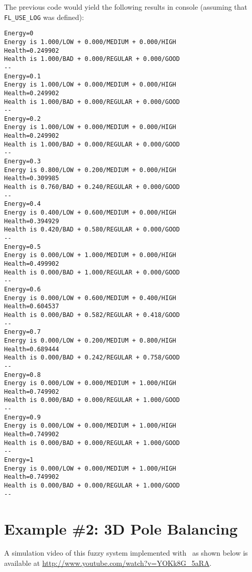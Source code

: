 	The previous code would yield the following results in console (assuming that \texttt{FL\_USE\_LOG} was defined):
	
	\begin{lstlisting}
Energy=0
Energy is 1.000/LOW + 0.000/MEDIUM + 0.000/HIGH
Health=0.249902
Health is 1.000/BAD + 0.000/REGULAR + 0.000/GOOD
--
Energy=0.1
Energy is 1.000/LOW + 0.000/MEDIUM + 0.000/HIGH
Health=0.249902
Health is 1.000/BAD + 0.000/REGULAR + 0.000/GOOD
--
Energy=0.2
Energy is 1.000/LOW + 0.000/MEDIUM + 0.000/HIGH
Health=0.249902
Health is 1.000/BAD + 0.000/REGULAR + 0.000/GOOD
--
Energy=0.3
Energy is 0.800/LOW + 0.200/MEDIUM + 0.000/HIGH
Health=0.309985
Health is 0.760/BAD + 0.240/REGULAR + 0.000/GOOD
--
Energy=0.4
Energy is 0.400/LOW + 0.600/MEDIUM + 0.000/HIGH
Health=0.394929
Health is 0.420/BAD + 0.580/REGULAR + 0.000/GOOD
--
Energy=0.5
Energy is 0.000/LOW + 1.000/MEDIUM + 0.000/HIGH
Health=0.499902
Health is 0.000/BAD + 1.000/REGULAR + 0.000/GOOD
--
Energy=0.6
Energy is 0.000/LOW + 0.600/MEDIUM + 0.400/HIGH
Health=0.604537
Health is 0.000/BAD + 0.582/REGULAR + 0.418/GOOD
--
Energy=0.7
Energy is 0.000/LOW + 0.200/MEDIUM + 0.800/HIGH
Health=0.689444
Health is 0.000/BAD + 0.242/REGULAR + 0.758/GOOD
--
Energy=0.8
Energy is 0.000/LOW + 0.000/MEDIUM + 1.000/HIGH
Health=0.749902
Health is 0.000/BAD + 0.000/REGULAR + 1.000/GOOD
--
Energy=0.9
Energy is 0.000/LOW + 0.000/MEDIUM + 1.000/HIGH
Health=0.749902
Health is 0.000/BAD + 0.000/REGULAR + 1.000/GOOD
--
Energy=1
Energy is 0.000/LOW + 0.000/MEDIUM + 1.000/HIGH
Health=0.749902
Health is 0.000/BAD + 0.000/REGULAR + 1.000/GOOD
--
	\end{lstlisting}
	
	\section{Example \#2: 3D Pole Balancing}
		A simulation video of this fuzzy system implemented with \fl\ as shown below is available at \url{http://www.youtube.com/watch?v=YOKk8G_5aRA}.
	
